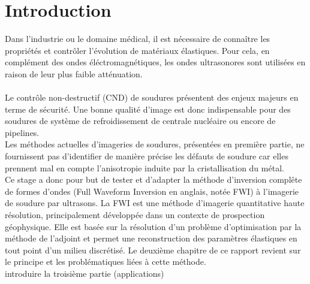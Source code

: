 \chapter{Introduction}

Dans l'industrie ou le domaine médical, il est nécessaire de connaître les propriétés et contrôler l'évolution de matériaux élastiques. Pour cela, en complément des ondes éléctromagnétiques,  les ondes ultrasonores sont utilisées en raison de leur plus faible atténuation.\\~\\

Le contrôle non-destructif (CND) de soudures présentent des enjeux majeurs en terme de sécurité. Une bonne qualité d'image est donc indispensable pour des soudures de système de refroidissement de centrale nucléaire ou encore de pipelines. \\
Les méthodes actuelles d'imageries de soudures, présentées en première partie, ne fournissent pas d'identifier de manière précise les défauts de soudure car elles prennent mal en compte l'anisotropie induite par la cristallisation du métal. \\


Ce stage a donc pour but de tester et d'adapter la méthode d'inversion complête de formes d'ondes (Full Waveform Inversion en anglais, notée FWI) à l'imagerie de soudure par ultrasons. La FWI est une méthode d'imagerie quantitative haute résolution, principalement développée dans un contexte de prospection géophysique. Elle est basée sur la résolution d'un problème d'optimisation par la méthode de l'adjoint et permet une reconstruction des paramètres élastiques en tout point d'un milieu discrétisé. Le deuxième chapitre de ce rapport revient sur le principe et les problématiques liées à cette méthode.\\


introduire la troisième partie (applications)





